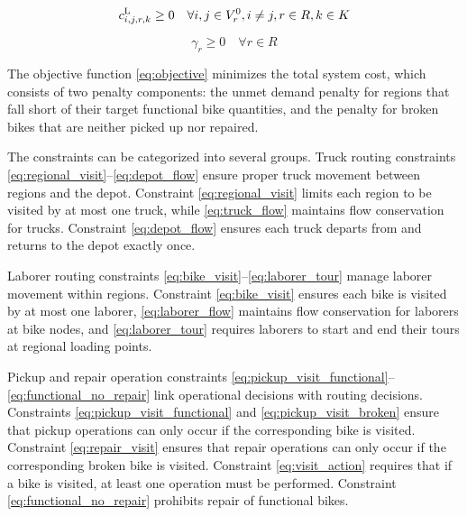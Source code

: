 \begin{linenomath}
    \begin{equation}
        c_{i,j,r,k}^{\text{L}} \geq 0 \quad \forall i,j \in V^0_r, i \neq j, r \in R, k \in K \label{eq:variable_domains_laborer}
    \end{equation}
\end{linenomath}

\begin{linenomath}
    \begin{equation}
        \gamma_r \geq 0 \quad \forall r \in R \label{eq:variable_domains_inventory}
    \end{equation}
\end{linenomath}


The objective function \eqref{eq:objective} minimizes the total system cost, which consists of two penalty components: the unmet demand penalty for regions that fall short of their target functional bike quantities, and the penalty for broken bikes that are neither picked up nor repaired.

The constraints can be categorized into several groups. Truck routing constraints \eqref{eq:regional_visit}--\eqref{eq:depot_flow} ensure proper truck movement between regions and the depot. Constraint \eqref{eq:regional_visit} limits each region to be visited by at most one truck, while \eqref{eq:truck_flow} maintains flow conservation for trucks. Constraint \eqref{eq:depot_flow} ensures each truck departs from and returns to the depot exactly once.

Laborer routing constraints \eqref{eq:bike_visit}--\eqref{eq:laborer_tour} manage laborer movement within regions. Constraint \eqref{eq:bike_visit} ensures each bike is visited by at most one laborer, \eqref{eq:laborer_flow} maintains flow conservation for laborers at bike nodes, and \eqref{eq:laborer_tour} requires laborers to start and end their tours at regional loading points.

Pickup and repair operation constraints \eqref{eq:pickup_visit_functional}--\eqref{eq:functional_no_repair} link operational decisions with routing decisions. Constraints \eqref{eq:pickup_visit_functional} and \eqref{eq:pickup_visit_broken} ensure that pickup operations can only occur if the corresponding bike is visited. Constraint \eqref{eq:repair_visit} ensures that repair operations can only occur if the corresponding broken bike is visited. Constraint \eqref{eq:visit_action} requires that if a bike is visited, at least one operation must be performed. Constraint \eqref{eq:functional_no_repair} prohibits repair of functional bikes.

